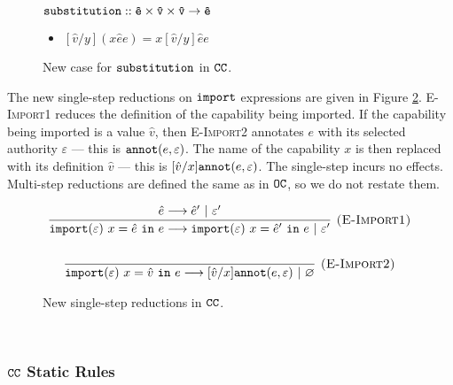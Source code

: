 \begin{figure}[h]

$\mathtt{substitution :: \hat e \times \hat v \times \hat v \rightarrow \hat e}$

\begin{itemize}
	\setlength\itemsep{-0.7em}
	\item[] $[\hat v/y]({x}{\hat e}{e}) = {x}{[\hat v/y]\hat e}{e}$
\end{itemize}

\vspace{-7pt}
\caption{New case for $\mathtt{substitution}$ in $\mathtt{CC}$.}
\label{fig:epscalc_sub_defn}
\end{figure}

The new single-step reductions on $\mathtt{import}$ expressions are given in Figure \ref{fig:opercalc_reductions}. \textsc{E-Import1} reduces the definition of the capability being imported. If the capability being imported is a value $\hat v$, then \textsc{E-Import2} annotates $e$ with its selected authority $\varepsilon$ --- this is $\mathtt{annot}(e, \varepsilon)$. The name of the capability $x$ is then replaced with its definition $\hat v$ --- this is $[\hat v/x]\mathtt{annot}(e, \varepsilon)$. The single-step incurs no effects. Multi-step reductions are defined the same as in $\mathtt{OC}$, so we do not restate them.

\begin{figure}[h]

\noindent
{}

\[
\begin{array}{c}
\infer[\textsc{(E-Import1)}]
	{\kwa{import}(\varepsilon)~x = \hat e~\kw{in} e \longrightarrow \kwa{import}(\varepsilon)~x = \hat e'~\kw{in} e~|~\varepsilon'}
	{\hat e \longrightarrow \hat e'~|~\varepsilon'}\\[4ex]

\infer[\textsc{(E-Import2)}]
	{\kwa{import}(\varepsilon)~x = \hat v~\kw{in} e \longrightarrow [\hat v/x]\kwa{annot}(e, \varepsilon)~|~\varnothing}
	{}

\end{array}
\]


\vspace{-7pt}
\caption{New single-step reductions in $\mathtt{CC}$.}
\label{fig:opercalc_reductions}
\end{figure}

~\\

\subsubsection{$\mathtt{CC}$ Static Rules}~\\

